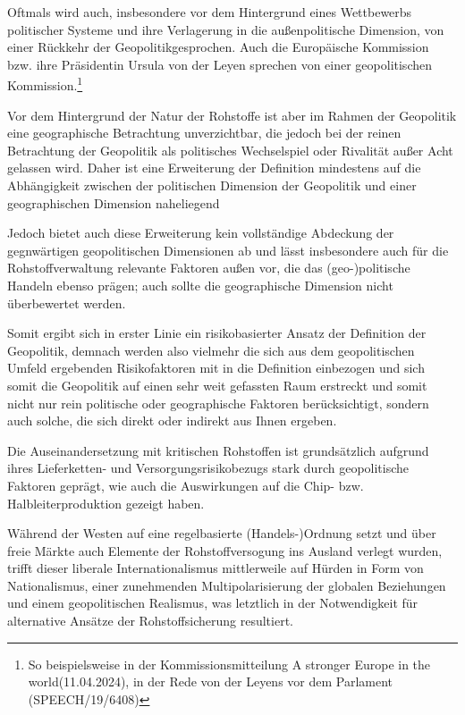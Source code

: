 \documentclass[12pt,a4paper,oneside]{book} %
\begin{document}
{	Oftmals wird auch, insbesondere vor dem Hintergrund eines Wettbewerbs politischer Systeme und ihre Verlagerung in die außenpolitische Dimension, von einer \glqq Rückkehr der Geopolitik\grqq gesprochen.\autocites{IP, Die Rückkehr der Geopolitik, 02.01.2024}{Die Rückkehr der Geopolitik? Möglichkeiten und Limitation geopolitischer Analysen} Auch die Europäische Kommission bzw. ihre Präsidentin Ursula von der Leyen sprechen von einer \glqq geopolitischen Kommission\grqq.\footnote{So beispielsweise in der Kommissionsmitteilung \glqq A stronger Europe in the world\grqq (11.04.2024), in der Rede von der Leyens vor dem Parlament (SPEECH/19/6408) }
	
	Vor dem Hintergrund der Natur der Rohstoffe ist aber im Rahmen der Geopolitik eine geographische Betrachtung unverzichtbar, die jedoch bei der reinen Betrachtung der Geopolitik als politisches Wechselspiel oder Rivalität außer Acht gelassen wird. Daher ist eine Erweiterung der Definition mindestens auf die Abhängigkeit zwischen der politischen Dimension der Geopolitik und einer geographischen Dimension naheliegend
	
	Jedoch bietet auch diese Erweiterung kein vollständige Abdeckung der gegnwärtigen geopolitischen Dimensionen ab und lässt insbesondere auch für die Rohstoffverwaltung relevante Faktoren außen vor, die das (geo-)politische  Handeln ebenso prägen; auch sollte die geographische Dimension nicht überbewertet werden.
	
	Somit ergibt sich in erster Linie ein risikobasierter Ansatz der Definition der Geopolitik, demnach werden also vielmehr die sich aus dem geopolitischen Umfeld ergebenden Risikofaktoren mit in die Definition einbezogen und sich somit die Geopolitik auf einen sehr weit gefassten Raum erstreckt und somit nicht nur rein politische oder geographische Faktoren berücksichtigt, sondern auch solche, die sich direkt oder indirekt aus Ihnen ergeben.
	
	Die Auseinandersetzung mit kritischen Rohstoffen ist grundsätzlich aufgrund ihres Lieferketten- und Versorgungsrisikobezugs stark durch geopolitische Faktoren geprägt, wie auch die Auswirkungen auf die Chip- bzw. Halbleiterproduktion gezeigt haben.
	
	Während der Westen auf eine regelbasierte (Handels-)Ordnung setzt und über freie Märkte auch Elemente der Rohstoffversogung ins Ausland verlegt wurden, trifft dieser liberale Internationalismus mittlerweile auf Hürden in Form von Nationalismus, einer zunehmenden Multipolarisierung der globalen Beziehungen und einem geopolitischen Realismus, was letztlich in der Notwendigkeit für alternative Ansätze der Rohstoffsicherung resultiert.\autocite{Frenz 2025, S. 84.}
	
}
\end{document}
